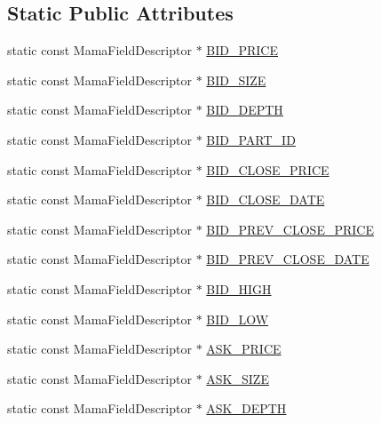 \subsection*{Static Public Attributes}
\begin{CompactItemize}
\item 
static const Mama\-Field\-Descriptor $\ast$ \hyperlink{classWombat_1_1MamdaQuoteFields_40dbe59d03aafd4a14e1070fd23f54d3}{BID\_\-PRICE}
\item 
static const Mama\-Field\-Descriptor $\ast$ \hyperlink{classWombat_1_1MamdaQuoteFields_79b5bca8ad0c5da43814b4bc6f65cde2}{BID\_\-SIZE}
\item 
static const Mama\-Field\-Descriptor $\ast$ \hyperlink{classWombat_1_1MamdaQuoteFields_10175019773e3a97a410e8e66fcfb0eb}{BID\_\-DEPTH}
\item 
static const Mama\-Field\-Descriptor $\ast$ \hyperlink{classWombat_1_1MamdaQuoteFields_672f39630fb40c4c83854bd3a8fc6769}{BID\_\-PART\_\-ID}
\item 
static const Mama\-Field\-Descriptor $\ast$ \hyperlink{classWombat_1_1MamdaQuoteFields_2a90ea7874538466a062540ff1b7cba3}{BID\_\-CLOSE\_\-PRICE}
\item 
static const Mama\-Field\-Descriptor $\ast$ \hyperlink{classWombat_1_1MamdaQuoteFields_be28e6e22f05504030522ea83a3837f5}{BID\_\-CLOSE\_\-DATE}
\item 
static const Mama\-Field\-Descriptor $\ast$ \hyperlink{classWombat_1_1MamdaQuoteFields_402a4e1e20711c496fc68e1a35acd615}{BID\_\-PREV\_\-CLOSE\_\-PRICE}
\item 
static const Mama\-Field\-Descriptor $\ast$ \hyperlink{classWombat_1_1MamdaQuoteFields_66f8b6097944654cc64fbbac4e41eb46}{BID\_\-PREV\_\-CLOSE\_\-DATE}
\item 
static const Mama\-Field\-Descriptor $\ast$ \hyperlink{classWombat_1_1MamdaQuoteFields_a789002a974555963baeb1a449f6d620}{BID\_\-HIGH}
\item 
static const Mama\-Field\-Descriptor $\ast$ \hyperlink{classWombat_1_1MamdaQuoteFields_79f05d17545363b5eeaa75cb95991778}{BID\_\-LOW}
\item 
static const Mama\-Field\-Descriptor $\ast$ \hyperlink{classWombat_1_1MamdaQuoteFields_25f1455c6396beee1e99eaa49feb0b4a}{ASK\_\-PRICE}
\item 
static const Mama\-Field\-Descriptor $\ast$ \hyperlink{classWombat_1_1MamdaQuoteFields_6885b9fb762a3fec1db110c6d93cc3f3}{ASK\_\-SIZE}
\item 
static const Mama\-Field\-Descriptor $\ast$ \hyperlink{classWombat_1_1MamdaQuoteFields_1503840616d85fd6ead757b1766e2879}{ASK\_\-DEPTH}

\end{CompactItemize}

